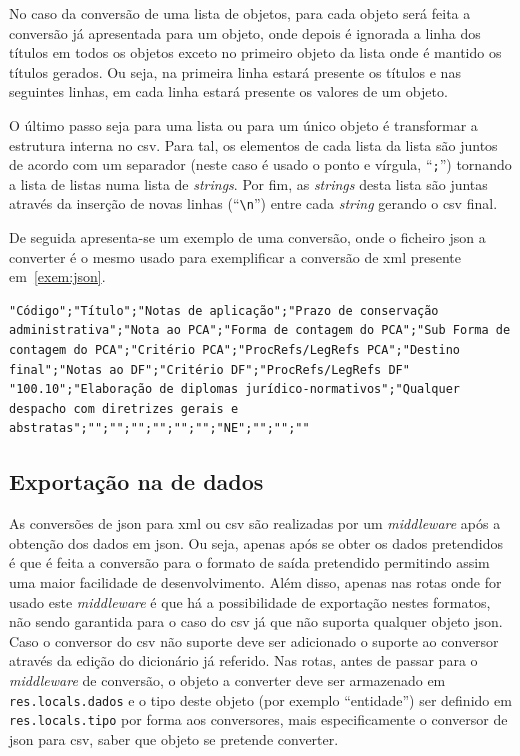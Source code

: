 No caso da conversão de uma lista de objetos, para cada objeto será feita a conversão já apresentada para um objeto, onde depois é ignorada a linha dos títulos em todos os objetos exceto no primeiro objeto da lista onde é mantido os títulos gerados. Ou seja, na primeira linha estará presente os títulos e nas seguintes linhas, em cada linha estará presente os valores de um objeto.

O último passo seja para uma lista ou para um único objeto é transformar a estrutura interna no \acrshort{csv}. Para tal, os elementos de cada lista da lista são juntos de acordo com um separador (neste caso é usado o ponto e vírgula, ``\texttt{;}'') tornando a lista de listas numa lista de \textit{strings}. Por fim, as \textit{strings} desta lista são juntas através da inserção de novas linhas (``\texttt{\textbackslash{}n}'') entre cada \textit{string} gerando o \acrshort{csv} final.

De seguida apresenta-se um exemplo de uma conversão, onde o ficheiro \acrshort{json} a converter é o mesmo usado para exemplificar a conversão de \acrshort{xml} presente em~\ref{exem:json}.

\begin{lstlisting}[caption=\acrshort{csv} resultante da conversão do \acrshort{json} presente em~\ref{exem:json}]
"Código";"Título";"Notas de aplicação";"Prazo de conservação administrativa";"Nota ao PCA";"Forma de contagem do PCA";"Sub Forma de contagem do PCA";"Critério PCA";"ProcRefs/LegRefs PCA";"Destino final";"Notas ao DF";"Critério DF";"ProcRefs/LegRefs DF"
"100.10";"Elaboração de diplomas jurídico-normativos";"Qualquer despacho com diretrizes gerais e abstratas";"";"";"";"";"";"";"NE";"";"";""
\end{lstlisting}

\subsection{Exportação na  de dados}

As conversões de \acrshort{json} para \acrshort{xml} ou \acrshort{csv} são realizadas por um \textit{middleware} após a obtenção dos dados em \acrshort{json}. Ou seja, apenas após se obter os dados pretendidos é que é feita a conversão para o formato de saída pretendido permitindo assim uma maior facilidade de desenvolvimento. Além disso, apenas nas rotas onde for usado este \textit{middleware} é que há a possibilidade de exportação nestes formatos, não sendo garantida para o caso do \acrshort{csv} já que não suporta qualquer objeto \acrshort{json}. Caso o conversor do \acrshort{csv} não suporte deve ser adicionado o suporte ao conversor através da edição do dicionário já referido. Nas rotas, antes de passar para o \textit{middleware} de conversão, o objeto a converter deve ser armazenado em \texttt{res.locals.dados} e o tipo deste objeto (por exemplo ``entidade'') ser definido em \texttt{res.locals.tipo} por forma aos conversores, mais especificamente o conversor de \acrshort{json} para \acrshort{csv}, saber que objeto se pretende converter.

